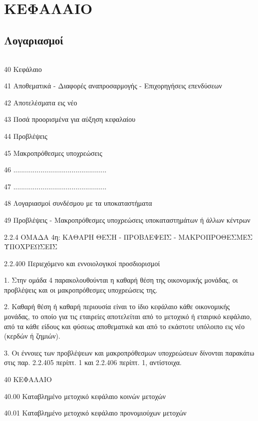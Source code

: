 \documentclass[A4,10pt,greek]{book}
\begin{document}
\chapter{ΚΕΦΑΛΑΙΟ}

\section{Λογαριασμοί}

\begin{tabularx}{\linewidth}{lX}

\end{tabularx}

40 Κεφάλαιο

41 Αποθεματικά - Διαφορές αναπροσαρμογής - Επιχορηγήσεις επενδύσεων 

42 Αποτελέσματα εις νέο

43 Ποσά προορισμένα για αύξηση κεφαλαίου 

44 Προβλέψεις

45 Μακροπρόθεσμες υποχρεώσεις 

46 ................................................

47 ................................................

48 Λογαριασμοί συνδέσμου με τα υποκαταστήματα 

49 Προβλέψεις - Μακροπρόθεσμες υποχρεώσεις υποκαταστημάτων ή άλλων κέντρων

2.2.4 ΟΜΑΔΑ 4η: ΚΑΘΑΡΗ ΘΕΣΗ - ΠΡΟΒΛΕΨΕΙΣ - ΜΑΚΡΟΠΡΟΘΕΣΜΕΣ ΥΠΟΧΡΕΩΣΕΙΣ

 2.2.400 Περιεχόμενο και εννοιολογικοί προσδιορισμοί

1. Στην ομάδα 4 παρακολουθούνται η καθαρή θέση της οικονομικής μονάδας, οι προβλέψεις και οι μακροπρόθεσμες υποχρεώσεις της.

2. Καθαρή θέση ή καθαρή περιουσία είναι το ίδιο κεφάλαιο κάθε οικονομικής μονάδας, το οποίο για τις εταιρείες αποτελείται από το μετοχικό ή εταιρικό κεφάλαιο, από τα κάθε είδους και φύσεως αποθεματικά και από το εκάστοτε υπόλοιπο εις νέο (κερδών ή ζημιών).

3. Οι έννοιες των προβλέψεων και μακροπρόθεσμων υποχρεώσεων δίνονται παρακάτω στις παρ. 2.2.405 περίπτ. 1 και 2.2.406 περίπτ. 1, αντίστοιχα.

 40   ΚΕΦΑΛΑΙΟ

        40.00   Καταβλημένο μετοχικό κεφάλαιο κοινών μετοχών  

        40.01   Καταβλημένο μετοχικό κεφάλαιο προνομιούχων μετοχών  
\end{document}
